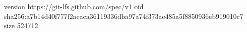 version https://git-lfs.github.com/spec/v1
oid sha256:a7b14d40f777f2aeaca36119336dba97a74f373ae485a5f8850936eb919010c7
size 524712
